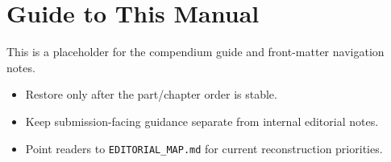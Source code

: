 \chapter*{Guide to This Manual}

This is a placeholder for the compendium guide and front-matter navigation notes.

\begin{itemize}[leftmargin=2em]
\item Restore only after the part/chapter order is stable.
\item Keep submission-facing guidance separate from internal editorial notes.
\item Point readers to \texttt{EDITORIAL\_MAP.md} for current reconstruction priorities.
\end{itemize}
